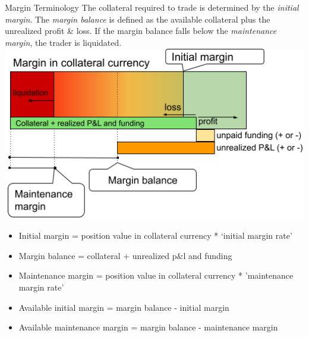 \documentclass[10pt,a4paper]{article}
\begin{document}
\begin{multicols}{3}
\begin{textbox}{Margin Terminology}
The collateral required to trade is determined by the
\emph{initial margin}. The \emph{margin balance} is defined as
the available collateral plus the unrealized profit \& loss.
If the margin balance falls below the \emph{maintenance margin},
the trader is liquidated.\\
\includegraphics[width=\textwidth]{Margin.png}\\
\begin{itemize}
    \item Initial margin = position value in collateral currency * ‘initial margin rate’
    \item Margin balance = collateral + unrealized p\&l and funding
    \item Maintenance margin = position value in collateral currency * ’maintenance margin rate’
    \item Available initial margin = margin balance - initial margin
    \item Available maintenance margin = margin balance - maintenance margin
\end{itemize}






\end{textbox}

\clearpage

\end{multicols}
\end{document}
